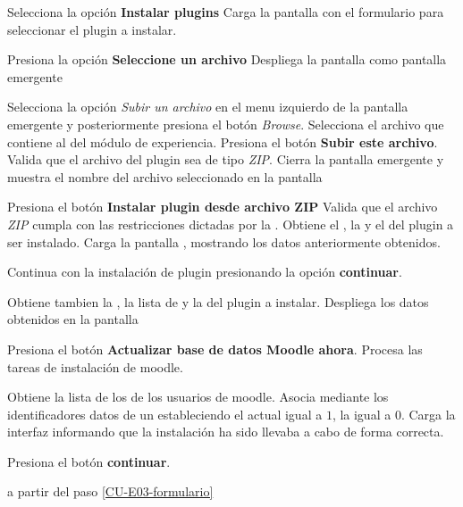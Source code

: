 \begin{UCtrayectoria}%
%

    \Actor Selecciona la opción {\bf Instalar plugins}
    \Sistema Carga la pantalla  con el formulario para seleccionar el
             plugin a instalar. \label{CU-E01-formulario-instalacion}

    \Actor Presiona la opción {\bf Seleccione un archivo} 
    \Sistema Despliega la pantalla  como pantalla emergente 
             \label{CU-E01-seleccion-archivo}

    \Actor Selecciona la opción {\it Subir un archivo} en el menu izquierdo de la pantalla
           emergente y posteriormente presiona el botón {\it Browse}.
    \Actor Selecciona el archivo que contiene al  del módulo de experiencia.
    \Actor Presiona el botón {\bf Subir este archivo}.
    \Sistema Valida que el archivo del plugin sea de tipo {\it ZIP}. 
    \Sistema Cierra la pantalla emergente y muestra el nombre del archivo seleccionado en la
             pantalla 

    \Actor Presiona el botón {\bf Instalar plugin desde archivo ZIP}
    \Sistema Valida que el archivo {\it ZIP} cumpla con las restricciones dictadas por la
             . 
    \Sistema Obtiene el , la  y el
              del plugin a ser instalado.
    \Sistema Carga la pantalla , mostrando los datos anteriormente obtenidos.

    \Actor Continua con la instalación de plugin presionando la opción {\bf continuar}. 

    \Sistema Obtiene tambien la , la lista de 
             y la  del plugin a instalar. 
             \label{CU-E01-comprobacion}
    \Sistema Despliega los datos obtenidos en la pantalla 

    \Actor Presiona el botón {\bf Actualizar base de datos Moodle ahora}. 
    \Sistema Procesa las tareas de instalación de moodle.

    \Sistema Obtiene la lista de los  de los
             usuarios de moodle.
    \Sistema Asocia mediante los identificadores datos de un 
             estableciendo el  actual igual a $1$,
             la  igual a $0$.
    \Sistema Carga la interfaz  informando que la instalación
             ha sido llevaba a cabo de forma correcta. 

    \Actor Presiona el botón {\bf continuar}.

     a partir del paso \ref{CU-E03-formulario}
\end{UCtrayectoria}

